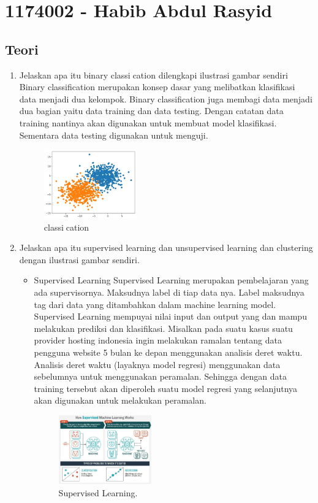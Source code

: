 \section{1174002 - Habib Abdul Rasyid}
\subsection{Teori}
\begin{enumerate}
	\item Jelaskan apa itu binary classication dilengkapi ilustrasi gambar sendiri
	\hfill\break
	Binary classification merupakan konsep dasar yang melibatkan klasifikasi data menjadi dua kelompok. Binary classification juga membagi data menjadi dua bagian yaitu data training dan data  testing. Dengan catatan data training nantinya akan digunakan untuk membuat model klasifikasi. Sementara data testing digunakan untuk menguji.
	\begin{figure}[H]
		\includegraphics[width=4cm]{figures/1174002/2/binary.PNG}
		\centering
		\caption{classication}
	\end{figure}

	\item Jelaskan apa itu supervised learning dan unsupervised learning dan clustering dengan ilustrasi gambar sendiri.
	\hfill\break


	\begin{itemize}
		\item Supervised Learning
		\hfill\break
		Supervised Learning merupakan pembelajaran yang ada supervisornya. Maksudnya label di tiap data nya. Label maksudnya tag dari data yang ditambahkan dalam machine learning model. Supervised Learning mempuyai nilai input dan output yang dan mampu melakukan prediksi dan klasifikasi. Misalkan pada suatu kasus suatu provider hosting indonesia ingin melakukan ramalan tentang data pengguna website 5 bulan ke depan menggunakan analisis deret waktu. Analisis deret waktu (layaknya model regresi) menggunakan data sebelumnya untuk menggunakan peramalan. Sehingga dengan data training tersebut akan diperoleh suatu model regresi yang selanjutnya akan digunakan untuk melakukan peramalan.
		\begin{figure}[H]
		\centering
			\includegraphics[width=4cm]{figures/1174002/2/supervisedlearning.PNG}
			\caption{Supervised Learning.}
		\end{figure}


\end{itemize}
\end{enumerate}
